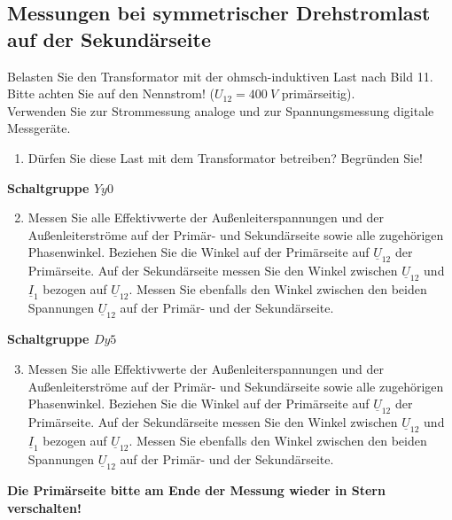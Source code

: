 \subsection{Messungen bei symmetrischer Drehstromlast auf der Sekundärseite }
Belasten Sie den Transformator mit der ohmsch-induktiven Last nach Bild 11.\\
Bitte achten Sie auf den Nennstrom! ($U_{12} = 400\ V$ primärseitig). \\
Verwenden Sie zur Strommessung analoge und zur Spannungsmessung digitale Messgeräte.  
\begin{enumerate}[label=\alph*)]
  \item Dürfen Sie diese Last mit dem Transformator betreiben? Begründen Sie!
\end{enumerate}
\textbf{Schaltgruppe $Yy0$}
\begin{enumerate}[label=\alph*)]
  \setcounter{enumi}{1}
  \item Messen Sie alle Effektivwerte der Außenleiterspannungen und der Außenleiterströme auf der Primär- und Sekundärseite sowie alle zugehörigen Phasenwinkel. Beziehen Sie die Winkel auf der Primärseite auf $\underline U_{12}$ der Primärseite. Auf der Sekundärseite messen Sie den Winkel zwischen $\underline U_{12}$ und $\underline I_1$ bezogen auf $\underline U_{12}$. Messen Sie ebenfalls den Winkel zwischen den beiden Spannungen $\underline U_{12}$ auf der Primär- und der Sekundärseite. 
\end{enumerate}
\textbf{Schaltgruppe $Dy5$}
\begin{enumerate}[label=\alph*)]
  \setcounter{enumi}{2}
  \item Messen Sie alle Effektivwerte der Außenleiterspannungen und der Außenleiterströme auf der Primär- und Sekundärseite sowie alle zugehörigen Phasenwinkel. Beziehen Sie die Winkel auf der Primärseite auf $\underline U_{12}$ der Primärseite. Auf der Sekundärseite messen Sie den Winkel zwischen $\underline U_{12}$ und $\underline I_1$ bezogen auf $\underline U_{12}$. Messen Sie ebenfalls den Winkel zwischen den beiden Spannungen $\underline U_{12}$ auf der Primär- und der Sekundärseite. 
\end{enumerate}
\textbf{Die Primärseite bitte am Ende der Messung wieder in Stern verschalten! }
